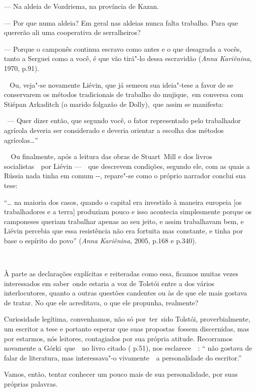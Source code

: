 --- Na aldeia de Vozdriema, na província de Kazan.

--- Por que numa aldeia? Em geral nas aldeias nunca falta trabalho. Para
que quererão ali uma cooperativa de serralheiros?

--- Porque o camponês continua escravo como antes e o que desagrada a
vocês, tanto a Serguei como a você, é que vão tirá"-lo dessa escravidão
(\emph{Anna Kariênina}, 1970, p.91).

\emph{~} Ou, veja"-se novamente Liévin, que já semeou sua ideia"-tese a
favor de se conservarem os métodos tradicionais de trabalho do
mujique,~em conversa com Stiépan Arkaditch (o marido folgazão de
Dolly),~que assim se manifesta:

~--- Quer dizer então, que segundo você, o fator representado pelo
trabalhador agrícola deveria ser considerado e deveria orientar a
escolha dos métodos agrícolas\ldots{}''

~~Ou finalmente, após a leitura das obras de Stuart~Mill e dos livros
socialistas~~por Liévin ---~~que descrevem condições, segundo ele, com as
quais a Rússia nada tinha em comum -\/-, repare"-se como o próprio
narrador conclui sua tese:

``\ldots{} na maioria dos casos, quando o capital era investido à maneira
europeia {[}os trabalhadores e a terra{]} produziam pouco e isso
acontecia simplesmente porque os camponeses queriam trabalhar apenas ao
seu jeito, e assim trabalhavam bem, e Liévin percebia que essa
resistência não era fortuita mas constante, e tinha por base o espírito
do povo'' (\emph{Anna Kariênina}, 2005, p.168 e p.340).

~

À parte as declarações explícitas e reiteradas como essa, ficamos muitas
vezes interessados em saber~onde estaria a voz de Tolstói entre a dos
vários interlocutores, quanto a outras questões candentes ou às de que
ele mais gostava de tratar. No que ele acreditava, o que ele propunha,
realmente?

Curiosidade legítima, convenhamos, não só por~ter~sido Tolstói,
proverbialmente, um escritor a tese e portanto esperar que suas
propostas~fossem discernidas, mas por estarmos, nós leitores,
contagiados por sua própria atitude. Recorramos novamente a
Górki~que~~no livro citado ( p.51), nos esclarece~~: `` não gostava
de falar de literatura, mas interessava"-o vivamente~~a personalidade do
escritor.''

Vamos, então, tentar conhecer um pouco mais de sua personalidade, por
suas próprias palavras.

